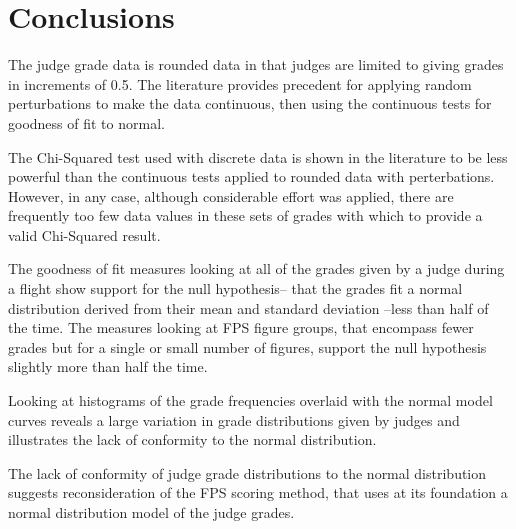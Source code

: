 \section{Conclusions}

The judge grade data is rounded data in that judges are limited to giving
grades in increments of 0.5. The literature provides precedent for applying
random perturbations to make the data continuous, then using the continuous
tests for goodness of fit to normal.

The Chi-Squared test used with discrete data is shown in the literature
to be less powerful than the continuous tests applied to rounded data with
perterbations. However, in any case, although considerable effort was
applied, there are frequently too few data
values in these sets of grades with which to provide a valid Chi-Squared
result.

The goodness of fit measures looking at all of the grades given by a judge
during a flight show support for the null hypothesis-- that the grades
fit a normal distribution derived from their mean and standard deviation
--less than half of the time.
The measures looking at FPS figure groups, that encompass fewer grades but
for a single or small number of figures, support the null hypothesis
slightly more than half the time.

Looking at histograms of the grade frequencies overlaid with the normal
model curves reveals a large variation in grade distributions given by
judges and illustrates the lack of conformity to the normal distribution.

The lack of conformity of judge grade distributions to the normal distribution
suggests reconsideration of the FPS scoring method, that uses at its
foundation a normal distribution model of the judge grades.
